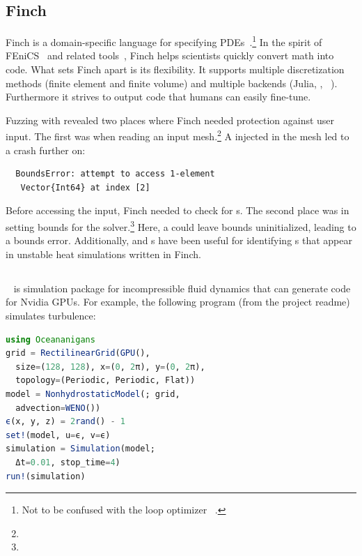 \documentclass{juliacon}
\begin{document}
\subsection{Finch}
\label{s:finch}

Finch is a domain-specific language for specifying
PDEs~\cite{heislerFinchDomainSpecific2022}.\footnote{Not to be confused
with the loop optimizer ~\cite{adka-cgo-2023}.}
In the spirit of FEniCS~\cite{fenics} and related
tools~\cite{freefem,openfoam,dune,firedrake},
Finch helps scientists quickly convert math into code.
What sets Finch apart is its flexibility.
It supports multiple discretization methods (finite element and finite
volume) and multiple backends (Julia, \CPP{}, \Dendro{}~\cite{dendro}).
Furthermore it strives to output code that humans can easily fine-tune.

Fuzzing with \TF{} revealed two places where Finch needed
protection against user input.
The first was when reading an input mesh.\footnote{}
A \NaN{} injected in the mesh led to a crash further on:

\begin{lstlisting}
  BoundsError: attempt to access 1-element
   Vector{Int64} at index [2]
\end{lstlisting}

Before accessing the input, Finch needed to check for \NaN{}s.
The second place was in setting bounds for the
solver.\footnote{}
Here, a \NaN{} could leave bounds uninitialized, leading to a bounds error.
Additionally, \TF{} and \CSTG{}s have been useful for identifying \NaN{}s that
appear in unstable heat simulations written in Finch.

\subsection{\Oceananigans{}}
\label{s:ocean}

\Oceananigans{}~\cite{OceananigansJOSS} is simulation package for incompressible
fluid dynamics that can generate code for Nvidia GPUs.
For example, the following program (from the project readme) simulates turbulence:

\begin{lstlisting}[language = Julia]
using Oceananigans
grid = RectilinearGrid(GPU(),
  size=(128, 128), x=(0, 2π), y=(0, 2π),
  topology=(Periodic, Periodic, Flat))
model = NonhydrostaticModel(; grid,
  advection=WENO())
ϵ(x, y, z) = 2rand() - 1
set!(model, u=ϵ, v=ϵ)
simulation = Simulation(model;
  Δt=0.01, stop_time=4)
run!(simulation)
\end{lstlisting}
\end{document}
